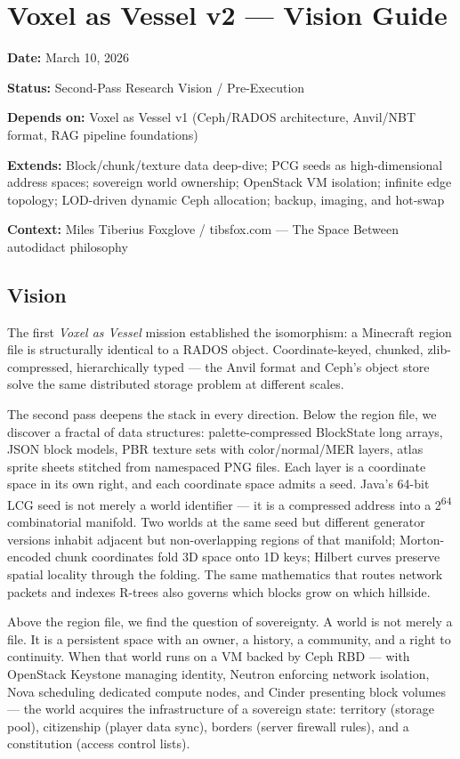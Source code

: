 \documentclass[11pt,letterpaper]{article}
\newcommand{\metafield}[2]{\textbf{\sffamily #1} #2\par}
\begin{document}
\section{Voxel as Vessel v2 --- Vision Guide}

\metafield{Date:}{March 10, 2026}
\metafield{Status:}{Second-Pass Research Vision / Pre-Execution}
\metafield{Depends on:}{Voxel as Vessel v1 (Ceph/RADOS architecture, Anvil/NBT format, RAG pipeline foundations)}
\metafield{Extends:}{Block/chunk/texture data deep-dive; PCG seeds as high-dimensional address spaces; sovereign world ownership; OpenStack VM isolation; infinite edge topology; LOD-driven dynamic Ceph allocation; backup, imaging, and hot-swap}
\metafield{Context:}{Miles Tiberius Foxglove / tibsfox.com --- The Space Between autodidact philosophy}

\subsection{Vision}

The first \emph{Voxel as Vessel} mission established the isomorphism: a Minecraft region file is structurally identical to a RADOS object. Coordinate-keyed, chunked, zlib-compressed, hierarchically typed --- the Anvil format and Ceph's object store solve the same distributed storage problem at different scales.

The second pass deepens the stack in every direction. Below the region file, we discover a fractal of data structures: palette-compressed BlockState long arrays, JSON block models, PBR texture sets with color/normal/MER layers, atlas sprite sheets stitched from namespaced PNG files. Each layer is a coordinate space in its own right, and each coordinate space admits a seed. Java's 64-bit LCG seed is not merely a world identifier --- it is a compressed address into a 2\textsuperscript{64} combinatorial manifold. Two worlds at the same seed but different generator versions inhabit adjacent but non-overlapping regions of that manifold; Morton-encoded chunk coordinates fold 3D space onto 1D keys; Hilbert curves preserve spatial locality through the folding. The same mathematics that routes network packets and indexes R-trees also governs which blocks grow on which hillside.

Above the region file, we find the question of sovereignty. A world is not merely a file. It is a persistent space with an owner, a history, a community, and a right to continuity. When that world runs on a VM backed by Ceph RBD --- with OpenStack Keystone managing identity, Neutron enforcing network isolation, Nova scheduling dedicated compute nodes, and Cinder presenting block volumes --- the world acquires the infrastructure of a sovereign state: territory (storage pool), citizenship (player data sync), borders (server firewall rules), and a constitution (access control lists).
\end{document}
